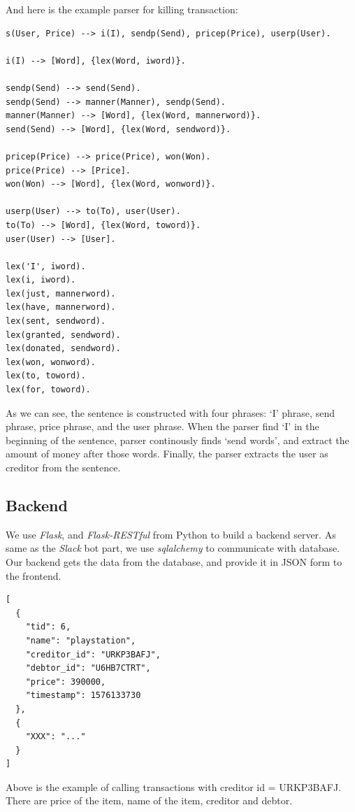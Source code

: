 \documentclass[11pt]{article}
\begin{document}
And here is the example parser for killing transaction:

\begin{verbatim}
s(User, Price) --> i(I), sendp(Send), pricep(Price), userp(User).

i(I) --> [Word], {lex(Word, iword)}.

sendp(Send) --> send(Send).
sendp(Send) --> manner(Manner), sendp(Send).
manner(Manner) --> [Word], {lex(Word, mannerword)}.
send(Send) --> [Word], {lex(Word, sendword)}.

pricep(Price) --> price(Price), won(Won).
price(Price) --> [Price].
won(Won) --> [Word], {lex(Word, wonword)}.

userp(User) --> to(To), user(User).
to(To) --> [Word], {lex(Word, toword)}.
user(User) --> [User].

lex('I', iword).
lex(i, iword).
lex(just, mannerword).
lex(have, mannerword).
lex(sent, sendword).
lex(granted, sendword).
lex(donated, sendword).
lex(won, wonword).
lex(to, toword).
lex(for, toword).
\end{verbatim}

As we can see, the sentence is constructed with four phrases:
`I' phrase, send phrase, price phrase, and the user phrase.
When the parser find `I' in the beginning of the sentence,
parser continously finds `send words', and extract the amount of money
after those words.
Finally, the parser extracts the user as creditor from the sentence.

\subsection{Backend}
We use \textit{Flask}, and \textit{Flask-RESTful} from Python to build a backend server.
As same as the \textit{Slack} bot part, we use \textit{sqlalchemy} to communicate with database.
Our backend gets the data from the database, and provide it in JSON form to the frontend.

\begin{verbatim}
[
  {
    "tid": 6,
    "name": "playstation",
    "creditor_id": "URKP3BAFJ",
    "debtor_id": "U6HB7CTRT",
    "price": 390000,
    "timestamp": 1576133730
  },
  {
    "XXX": "..."
  }
]
\end{verbatim}

Above is the example of calling transactions with creditor id = URKP3BAFJ.
There are price of the item, name of the item, creditor and debtor.
\end{document}
